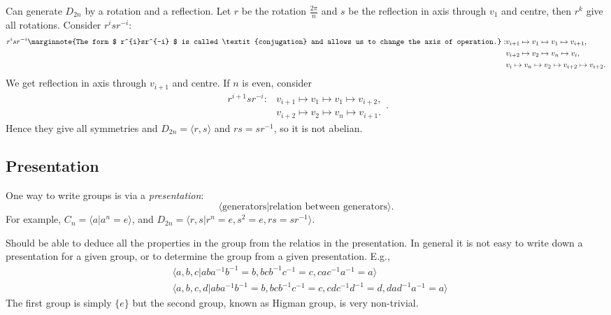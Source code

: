 \documentclass[10pt]{article}
\begin{document}
    \begin{remark}
        Can generate $ D_{2n} $ by a rotation and a reflection. Let $ r $ be the rotation $ \frac{2\pi}{n} $ and $s$ be the reflection in axis through $v_1$ and centre, then $r^k$ give all rotations. Consider $ r^{i}sr^{-i} $:
        \[
            \begin{aligned}
                r^{i}sr^{-i}\marginnote{The form $ r^{i}sr^{-i} $ is called \textit{conjugation} and allows us to change the axis of operation.}: &v_{i+1}\mapsto v_1 \mapsto v_1 \mapsto v_{i+1},\\
                &v_{i+2} \mapsto v_2 \mapsto v_{n} \mapsto v_i,\\
                &v_i \mapsto v_n \mapsto v_2 \mapsto v_{i+2} \mapsto v_{i+2}.
            \end{aligned}
        \]
        We get reflection in axis through $ v_{i+1} $ and centre. If $ n $ is even, consider 
        \[
            \begin{aligned}
                r^{i+1}sr^{-i}:& v_{i+1} \mapsto v_1 \mapsto v_1 \mapsto v_{i+2},\\
                &v_{i+2} \mapsto v_2 \mapsto v_n \mapsto v_{i+1}.
            \end{aligned}
        .\]
        Hence they give all symmetries and $ D_{2n}=\langle r,s \rangle $ and $ rs=sr^{-1} $, so it is not abelian.
    \end{remark}
    \subsection{Presentation}
    One way to write groups is via a \textit{presentation}:
    \[
        \langle \text{generators}|\text{relation between generators} \rangle 
    .\]
    For example, $ C_n=\langle a|a^n=e \rangle  $, and $ D_{2n}=\langle r,s|r^n=e, s^2=e, rs=sr^{-1} \rangle  $.

    Should be able to deduce all the properties in the group from the relatios in the presentation. In general it is not easy to write down a presentation for a given group, or to determine the group from a given presentation. E.g., 
    \[
        \begin{aligned}
            &\langle a,b,c| aba^{-1}b^{-1}=b, bcb^{-1}c^{-1}=c, cac^{-1}a^{-1}=a \rangle\\
            &\langle a,b,c,d| aba^{-1}b^{-1}=b, bcb^{-1}c^{-1}=c,cdc^{-1}d^{-1}=d,dad^{-1}a^{-1}=a \rangle 
        \end{aligned}
    \]
    The first group is simply $\{e\}$ but the second group, known as Higman group, is very non-trivial.
\end{document}

